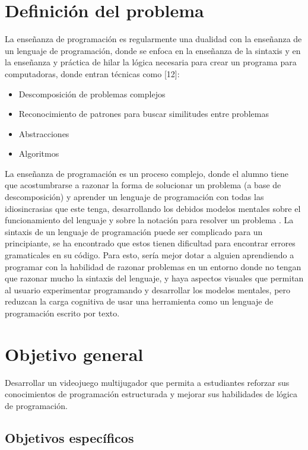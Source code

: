 \section{Definición del problema}
La enseñanza de programación es regularmente una dualidad con la enseñanza de un lenguaje de programación, donde se enfoca en la enseñanza de la sintaxis y en la enseñanza y práctica de hilar la lógica necesaria para crear un programa para computadoras, donde entran técnicas como [12]:
\begin{itemize}
    \item Descomposición de problemas complejos
    \item Reconocimiento de patrones para buscar similitudes entre problemas
    \item Abstracciones
    \item Algoritmos
\end{itemize}

La enseñanza de programación es un proceso complejo, donde el alumno tiene que acostumbrarse a razonar la forma de solucionar un problema (a base de descomposición) y aprender un lenguaje de programación con todas las idiosincrasias que este tenga, desarrollando los debidos modelos mentales sobre el funcionamiento del lenguaje y sobre la notación para resolver un problema \cite{mow-a}. La sintaxis de un lenguaje de programación puede ser complicado para un principiante, se ha encontrado que estos tienen dificultad para encontrar errores gramaticales en su código. Para esto, sería mejor dotar a alguien aprendiendo a programar con la habilidad de razonar problemas en un entorno donde no tengan que razonar mucho la sintaxis del lenguaje, y haya aspectos visuales que permitan al usuario experimentar programando y desarrollar los modelos mentales, pero reduzcan la carga cognitiva de usar una herramienta como un lenguaje de programación escrito por texto. 

\section{Objetivo general}
Desarrollar un videojuego multijugador que permita a estudiantes reforzar sus conocimientos de programación estructurada y mejorar sus habilidades de lógica de programación. 

\subsection{Objetivos específicos}

